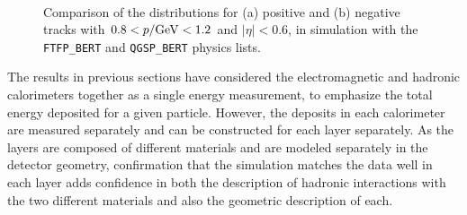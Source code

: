 \begin{figure}[ht]
\centering
{}
~
\caption{ Comparison of the \ep distributions for (a) positive and (b) negative tracks with $0.8< p/\mathrm{Ge\kern -0.05em V}<1.2$ and $|\eta|<0.6$, in simulation with the \texttt{FTFP\_BERT} and \texttt{QGSP\_BERT} physics lists.}
\label{fig:eoverp_charge}
\end{figure}

The \epav results in previous sections have considered the electromagnetic and hadronic calorimeters together as a single energy measurement, to emphasize the total energy deposited for a given particle. 
However, the deposits in each calorimeter are measured separately and \epav can be constructed for each layer separately. 
As the layers are composed of different materials and are modeled separately in the detector geometry, confirmation that the simulation matches the data well in each layer adds confidence in both the description of hadronic interactions with the two different materials and also the geometric description of each. 

